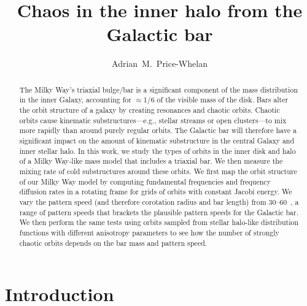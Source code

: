 \documentclass[modern]{aastex61}
\begin{document}
\sloppy\sloppypar\raggedbottom\frenchspacing %

\title{Chaos in the inner halo from the Galactic bar}

\author[0000-0003-0872-7098]{Adrian~M.~Price-Whelan}



\begin{abstract}
The Milky Way's triaxial bulge/bar is a significant component of the mass
distribution in the inner Galaxy, accounting for $\approx$1/6 of the visible
mass of the disk.
Bars alter the orbit structure of a galaxy by creating resonances and chaotic
orbits.
Chaotic orbits cause kinematic substructures---e.g., stellar streams or open
clusters---to mix more rapidly than around purely regular orbits.
The Galactic bar will therefore have a significant impact on the amount of
kinematic substructure in the central Galaxy and inner stellar halo.
In this work, we study the types of orbits in the inner disk and halo of a Milky
Way-like mass model that includes a triaxial bar.
We then measure the mixing rate of cold substructures around these orbits.
We first map the orbit structure of our Milky Way model by computing fundamental
frequencies and frequency diffusion rates in a rotating frame for grids of
orbits with constant Jacobi energy.
We vary the pattern speed (and therefore corotation radius and bar length)
from 30--60~\kmskpc, a range of pattern speeds that brackets the plausible
pattern speeds for the Galactic bar.
We then perform the same tests using orbits sampled from stellar halo-like
distribution functions with different anisotropy parameters to see how the
number of strongly chaotic orbits depends on the bar mass and pattern speed.
\end{abstract}


\section{Introduction} \label{sec:intro}
\end{document}
